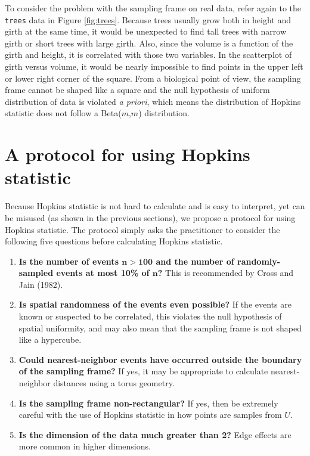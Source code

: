 To consider the problem with the sampling frame on real data, refer again to the \texttt{trees} data in Figure \ref{fig:trees}. Because trees usually grow both in height and girth at the same time, it would be unexpected to find tall trees with narrow girth or short trees with large girth. Also, since the volume is a function of the girth and height, it is correlated with those two variables. In the scatterplot of girth versus volume, it would be nearly impossible to find points in the upper left or lower right corner of the square. From a biological point of view, the sampling frame cannot be shaped like a square and the null hypothesis of uniform distribution of data is violated \emph{a priori}, which means the distribution of Hopkins statistic does not follow a Beta(\(m\),\(m\)) distribution.

\hypertarget{a-protocol-for-using-hopkins-statistic}{%
\section{A protocol for using Hopkins statistic}\label{a-protocol-for-using-hopkins-statistic}}

Because Hopkins statistic is not hard to calculate and is easy to interpret, yet can be misused (as shown in the previous sections), we propose a protocol for using Hopkins statistic. The protocol simply asks the practitioner to consider the following five questions before calculating Hopkins statistic.

\begin{enumerate}
\def\labelenumi{\arabic{enumi}.}
\tightlist
\item
  \textbf{Is the number of events \(\mathbf{n > 100}\) and the number of randomly-sampled events at most 10\% of \(\mathbf{n}\)?} This is recommended by Cross and Jain (1982).
\item
  \textbf{Is spatial randomness of the events even possible?} If the events are known or suspected to be correlated, this violates the null hypothesis of spatial uniformity, and may also mean that the sampling frame is not shaped like a hypercube.
\item
  \textbf{Could nearest-neighbor events have occurred outside the boundary of the sampling frame?} If yes, it may be appropriate to calculate nearest-neighbor distances using a torus geometry.
\item
  \textbf{Is the sampling frame non-rectangular?} If yes, then be extremely careful with the use of Hopkins statistic in how points are samples from \(U\).
\item
  \textbf{Is the dimension of the data much greater than 2?} Edge effects are more common in higher dimensions.
\end{enumerate}

